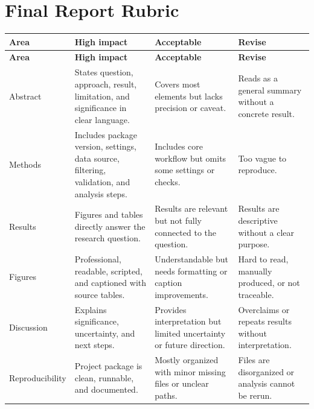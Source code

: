 \section{Final Report Rubric}
\begin{longtable}{p{}p{}p{}p{}}
\toprule
\textbf{Area} & \textbf{High impact} & \textbf{Acceptable} & \textbf{Revise}\\
\midrule
\endfirsthead
\toprule
\textbf{Area} & \textbf{High impact} & \textbf{Acceptable} & \textbf{Revise}\\
\midrule
\endhead
Abstract & States question, approach, result, limitation, and significance in clear language. & Covers most elements but lacks precision or caveat. & Reads as a general summary without a concrete result.\\
Methods & Includes package version, settings, data source, filtering, validation, and analysis steps. & Includes core workflow but omits some settings or checks. & Too vague to reproduce.\\
Results & Figures and tables directly answer the research question. & Results are relevant but not fully connected to the question. & Results are descriptive without a clear purpose.\\
Figures & Professional, readable, scripted, and captioned with source tables. & Understandable but needs formatting or caption improvements. & Hard to read, manually produced, or not traceable.\\
Discussion & Explains significance, uncertainty, and next steps. & Provides interpretation but limited uncertainty or future direction. & Overclaims or repeats results without interpretation.\\
Reproducibility & Project package is clean, runnable, and documented. & Mostly organized with minor missing files or unclear paths. & Files are disorganized or analysis cannot be rerun.\\
\bottomrule
\end{longtable}

